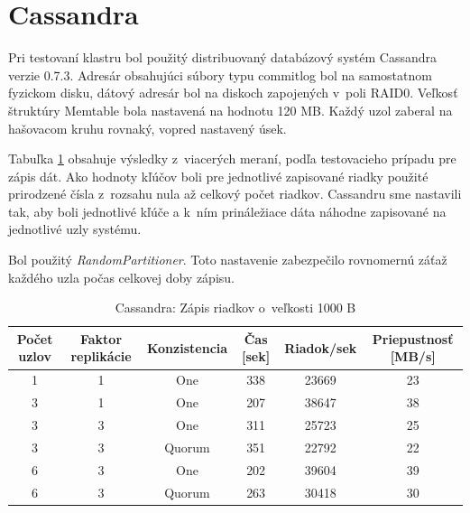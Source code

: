 \documentclass[11pt,twoside,a4paper]{book}
\begin{document}
\section{Cassandra}

Pri testovaní klastru bol použitý distribuovaný databázový systém Cassandra verzie 0.7.3. Adresár obsahujúci súbory typu commitlog bol na samostatnom fyzickom disku, dátový adresár bol na diskoch zapojených v~poli RAID0. Veľkosť štruktúry Memtable bola nastavená na hodnotu 120 MB. Každý uzol zaberal na hašovacom kruhu rovnaký, vopred nastavený úsek.

Tabuľka \ref{tab:CPerf2} obsahuje výsledky z~viacerých meraní, podľa testovacieho prípadu pre zápis dát. Ako hodnoty kľúčov boli pre jednotlivé zapisované riadky použité prirodzené čísla z~rozsahu nula až celkový počet riadkov. Cassandru sme nastavili tak, aby boli jednotlivé kľúče a k~ním prináležiace dáta náhodne zapisované na jednotlivé uzly systému. 

Bol použitý \emph{RandomPartitioner}. Toto nastavenie zabezpečilo rovnomernú záťaž každého uzla počas celkovej doby zápisu.

\begin{table}[hp]
\begin{center}
\begin{tabular}{|c|c|c|c|c|c|}
\hline Počet uzlov & Faktor replikácie & Konzistencia & Čas [sek] & Riadok/sek & Priepustnosť [MB/s]\\ 
\hline
\hline 1 & 1 & One & 338 & 23669 & 23\\ 
\hline 3 & 1 & One & 207 & 38647 & 38\\ 
\hline 3 & 3 & One & 311 & 25723 & 25\\ 
\hline 3 & 3 & Quorum & 351 & 22792 & 22\\ 
\hline 6 & 3 & One & 202 & 39604 & 39\\ 
\hline 6 & 3 & Quorum & 263 & 30418 & 30\\ 
\hline
\end{tabular} 
\end{center}
\caption{Cassandra: Zápis riadkov o~veľkosti 1000 B}
\label{tab:CPerf2}
\end{table}
\end{document}
